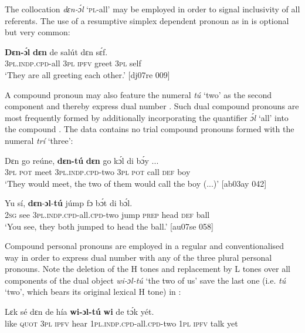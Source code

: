 The collocation \textit{dɛn-ɔ́l} ‘\textsc{pl}-all’ may be employed in order to signal inclusivity of all referents. The use of a resumptive simplex dependent pronoun as in  is optional but very common: 



\ea%
    \label{ex:key:293}
    \gll \textbf{Dɛn-ɔ́l}      \textbf{dɛn}  de  salút  dɛn  sɛ́f.\\
\textsc{3pl.indp.cpd-}all  \textsc{3pl}  \textsc{ipfv}  greet  \textsc{3pl}  self\\

\glt ‘They are all greeting each other.’ [dj07re 009]
\z

A compound pronoun may also feature the numeral \textit{tú} ‘two’ as the second component and thereby express dual number . Such dual compound pronouns are most frequently formed by additionally incorporating the quantifier \textit{ɔ́l} ‘all’ into the compound . The data contains no trial compound pronouns formed with the numeral \textit{trí} ‘three’:


\ea%
    \label{ex:key:294}
    \gll Dɛn  go  reúne,  \textbf{dɛn-tú}      \textbf{dɛn}  go  kɔ́l  di  bɔ́y  \op...\cp{}\\
\textsc{3pl}  \textsc{pot}  meet  \textsc{3pl.indp.cpd-}two  \textsc{3pl}  \textsc{pot}  call  \textsc{def}  boy\\

\glt ‘They would meet, the two of them would call the boy (...)’  [ab03ay 042]
\z


\ea%
    \label{ex:key:295}
    \gll Yu  sí,  \textbf{dɛn}{}-\textbf{ɔl}{}-\textbf{tú}     júmp  fɔ  bɔ́t    di  bɔ́l.\\
\textsc{2sg}  see  \textsc{3pl.indp.cpd-}all.\textsc{cpd}{}-two  jump  \textsc{prep}  head  \textsc{def}  ball\\

\glt ‘You see, they both jumped to head the ball.’ [au07se 058]
\z

Compound personal pronouns are employed in a regular and conventionalised way in order to express dual number with any of the three plural personal pronouns. Note the deletion of the H tones and replacement by L tones over all components of the dual object \textit{wi-ɔl-tú} ‘the two of us’ save the last one (i.e. \textit{tú} ‘two’, which bears its original lexical H tone) in :


\ea%
    \label{ex:key:296}
    \gll Lɛk  sé    dɛn  de    hía    \textbf{wi-ɔl-tú}    \textbf{wi}  de  tɔ́k  yét.\\
like  \textsc{quot}  \textsc{3pl}  \textsc{ipfv}  hear    \textsc{1pl.indp.cpd-}all.\textsc{cpd}{}-two  \textsc{1pl}  \textsc{ipfv}  talk  yet\\

